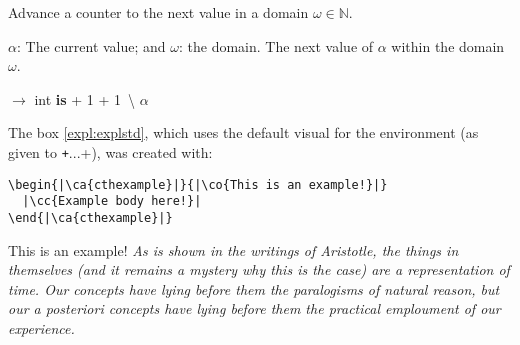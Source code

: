 \documentclass{article}
\begin{document}
\begin{cthalgorithm}{Advance a counter to the next value in a domain $\omega \in \mathbb{N}$.}
  \label{alg:advance1}
\begin{algorithmic}[1]
  \Statex \Input $\alpha$: The current value; and $\omega$: the domain.
  \Statex \Output The next value of $\alpha$ within the domain $\omega$.

  \Vspace

   $\rightarrow$ int \textbf{is}
    \Let {\alpha} {\alpha + 1}
    \While{$\alpha \not\in \omega \And \omega \neq \bracesemptyset$}
      \Let {\alpha} {\alpha + 1}
    \EndWhile
    \If{$\omega \neq \bracesemptyset$}
      \Let {\omega} {\omega \,\backslash \lbrace \alpha \rbrace}
    \EndIf
    \State \Return $\alpha$
  \EndFunction
\end{algorithmic}
\end{cthalgorithm}

The box \autoref{expl:explstd}, which uses the default visual for the environment (as given to \texttt+\cthnewtheorem...+), was created with:

\begin{verbatim}
\begin{|\ca{cthexample}|}{|\co{This is an example!}|}
  |\cc{Example body here!}|
\end{|\ca{cthexample}|}
\end{verbatim}


\begin{cthexample}{This is an example!}
  \label{expl:explstd}
  \emph{As is shown in the writings of Aristotle, the things in themselves (and it remains a mystery why this is the case) are a representation of time. Our concepts have lying before them the paralogisms of natural reason, but our a posteriori concepts have lying before them the practical emploument of our experience.}
\end{cthexample}
\end{document}
